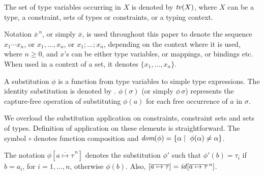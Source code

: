 The set of type variables occurring in $X$ is denoted by $\text{\it tv\/}(X)$,
where $X$ can be a type, a constraint, sets of types or constraints,
or a typing context.

Notation $\overline{x}^{\,n}$, or simply $\overline{x}$, is used
throughout this paper to denote the sequence $x_1 \cdots x_n$, or
$x_1, \ldots, x_n$, or $x_1;\ldots;x_n$, depending on the context
where it is used, where $n\geq 0$, and $x$'s can be either type
variables, or mappings, or bindings etc.  When used in a context of a
set, it denotes $\{x_1,\ldots,x_n\}$.

A substitution $\phi$ is a function from type variables to simple type
expressions. The identity substitution is denoted by
\id. $\phi(\sigma)$ (or simply $\phi\,\sigma$) represents the
capture-free operation of substituting $\phi(a)$ for each free
occurrence of $a$ in $\sigma$.

We overload the substitution application on constraints, constraint
sets and sets of types. Definition of application on these elements is
straightforward. The symbol $\circ$ denotes function composition and
$\textit{dom}(\phi)=\{\alpha \mid\ \phi(\alpha) \neq \alpha\}$.

The notation $\phi[\overline{a\mapsto\tau}^{\,n}]$ denotes the
substitution $\phi'$ such that $\phi'(b) = \tau_i$ if $b = a_i$, for
$i = 1,...,n$, otherwise $\phi(b)$. Also, $[\overline{a\mapsto\tau}] =
\text{\it id\/}[\overline{a\mapsto\tau}^{\,n}]$.

